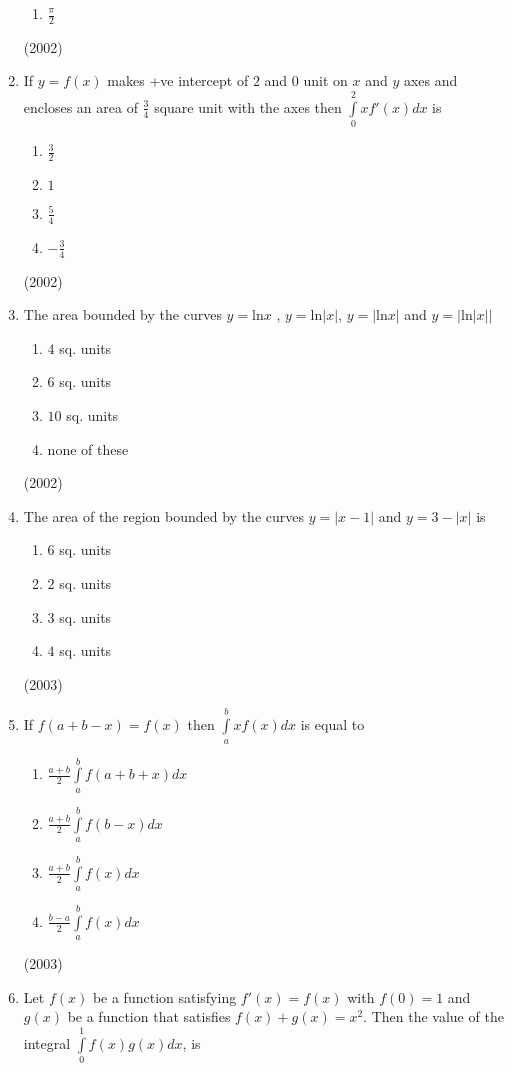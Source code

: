 \documentclass[journal,12pt,twocolumn]{IEEEtran}
\theoremstyle{remark}
\begin{document}
\begin{enumerate}[1.]
\begin{enumerate}
					\item $\frac{\pi}{2}$
			\end{enumerate}
			\hfill (2002)
	\item
		If $y=f(x)$ makes +ve intercept of $2$ and $0$ unit on $x$ and $y$ axes and encloses an area of $\frac{3}{4}$ square unit with the axes then $\int \limits_0^2 x f'(x)dx$ is
			\begin{enumerate}
				\item $\frac{3}{2}$
				\item $1$
				\item $\frac{5}{4}$
				\item $-\frac{3}{4}$
			\end{enumerate}
			\hfill (2002)
	\item
		The area bounded by the curves $y= \mathrm{ln} x$ , $y= \mathrm{ln} |x|$, $y=|\mathrm{ln}x|$ and $y=| \mathrm{ln} |x||$
			\begin{enumerate}
					\item $4$ sq. units
					\item $6$ sq. units
					\item $10$ sq. units
					\item none of these
			\end{enumerate}
			\hfill(2002)
	\item
		The area of the region bounded by the curves $y= |x-1|$ and $y=3-|x|$ is
			\begin {enumerate}
				\item $6$ sq. units
				\item $2$ sq. units
				\item $3$ sq. units
				\item $4$ sq. units
			\end {enumerate}
			\hfill (2003)
	\item
		If $f(a+b-x)=f(x)$ then $\int \limits_a^b xf(x)dx$ is equal to
			\begin {enumerate}
				\item $\frac{a+b}{2} \int \limits_a^b f(a+b+x)dx$
				\item $\frac{a+b}{2} \int \limits_a^b f(b-x)dx$
				\item $\frac{a+b}{2} \int \limits_a^b f(x)dx$
				\item $\frac{b-a}{2} \int \limits_a^b f(x)dx$
			\end {enumerate}
			\hfill (2003)
	\item 
		Let $f(x)$ be a function satisfying $f'(x) = f(x)$ with $f(0)=1$ and $g(x)$ be a function that satisfies $f(x) + g(x)=x^2$. Then the value of the integral $\int \limits_0^1 f(x)g(x)dx$, is

\end{enumerate}
\end{document}
